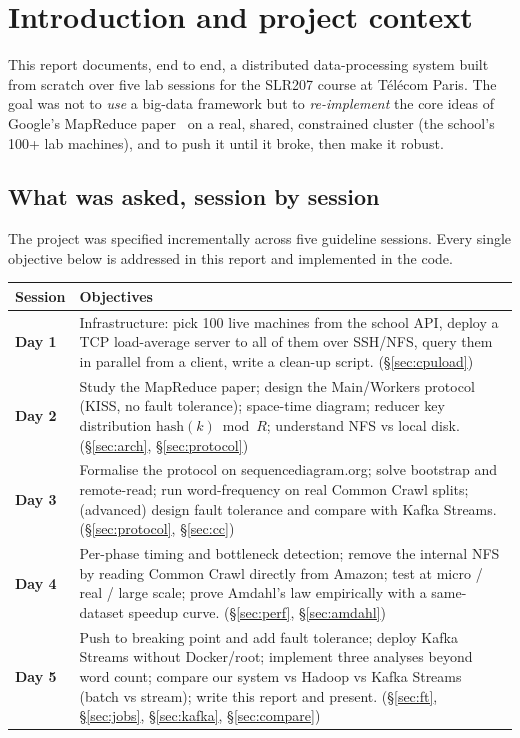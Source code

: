 \documentclass[11pt,a4paper]{article}
\begin{document}
\tableofcontents
\newpage

\section{Introduction and project context}

This report documents, end to end, a distributed data-processing system built
from scratch over five lab sessions for the SLR207 course at Télécom Paris. The
goal was not to \emph{use} a big-data framework but to \emph{re-implement} the
core ideas of Google's MapReduce paper~\cite{mapreduce} on a real, shared,
constrained cluster (the school's 100+ lab machines), and to push it until it
broke, then make it robust.

\subsection{What was asked, session by session}

The project was specified incrementally across five guideline sessions. Every
single objective below is addressed in this report and implemented in the code.

\begin{table}[H]
\centering
\small
\renewcommand{\arraystretch}{1.25}
\begin{tabularx}{\textwidth}{@{}p{2.1cm}X@{}}
\toprule
\textbf{Session} & \textbf{Objectives}\\
\midrule
\textbf{Day 1} & Infrastructure: pick 100 live machines from the school API, deploy a TCP load-average server to all of them over SSH/NFS, query them in parallel from a client, write a clean-up script. (\S\ref{sec:cpuload})\\
\textbf{Day 2} & Study the MapReduce paper; design the Main/Workers protocol (KISS, no fault tolerance); space-time diagram; reducer key distribution $\mathrm{hash}(k)\bmod R$; understand NFS vs local disk. (\S\ref{sec:arch}, \S\ref{sec:protocol})\\
\textbf{Day 3} & Formalise the protocol on sequencediagram.org; solve bootstrap and remote-read; run word-frequency on real Common Crawl splits; (advanced) design fault tolerance and compare with Kafka Streams. (\S\ref{sec:protocol}, \S\ref{sec:cc})\\
\textbf{Day 4} & Per-phase timing and bottleneck detection; remove the internal NFS by reading Common Crawl directly from Amazon; test at micro / real / large scale; prove Amdahl's law empirically with a same-dataset speedup curve. (\S\ref{sec:perf}, \S\ref{sec:amdahl})\\
\textbf{Day 5} & Push to breaking point and add fault tolerance; deploy Kafka Streams without Docker/root; implement three analyses beyond word count; compare our system vs Hadoop vs Kafka Streams (batch vs stream); write this report and present. (\S\ref{sec:ft}, \S\ref{sec:jobs}, \S\ref{sec:kafka}, \S\ref{sec:compare})\\
\bottomrule
\end{tabularx}
\end{table}
\end{document}
